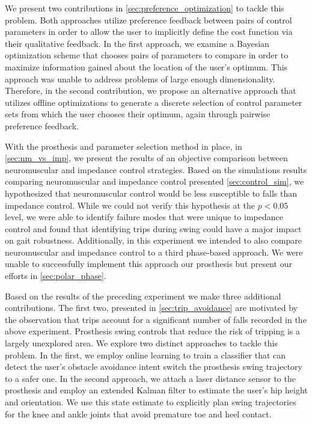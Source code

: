 We present two contributions in \cref{sec:preference_optimization} to tackle
this problem. Both approaches utilize preference feedback between pairs of
control parameters in order to allow the user to implicitly define the cost
function via their qualitative feedback. In the first approach, we examine a
Bayesian optimization scheme that chooses pairs of parameters to compare in
order to maximize information gained about the location of the user's optimum.
This approach was unable to address problems of large enough dimensionality.
Therefore, in the second contribution, we propose an alternative approach that
utilizes offline optimizations to generate a discrete selection of control
parameter sets from which the user chooses their optimum, again through pairwise
preference feedback.

With the prosthesis and parameter selection method in place, in
\cref{sec:nm_vs_imp}, we present the results of an objective comparison between
neuromuscular and impedance control strategies. Based on the simulations results
comparing neuromuscular and impedance control presented \cref{sec:control_sim},
we hypothesized that neuromuscular control would be less susceptible to falls
than impedance control. While we could not verify this hypothesis at the $p <
0.05$ level, we were able to identify failure modes that were unique to
impedance control and found that identifying trips during swing could have a
major impact on gait robustness. Additionally, in this experiment we intended to
also compare neuromuscular and impedance control to a third phase-based
approach. We were unable to successfully implement this approach our prosthesis
but present our efforts in \cref{sec:polar_phase}.

Based on the results of the preceding experiment we make three
additional contributions. The first two, presented in \cref{sec:trip_avoidance}
are motivated by the observation that trips account for a significant number of
falls recorded in the above experiment. Prosthesis swing controls that reduce
the risk of tripping is a largely unexplored area. We explore two distinct
approaches to tackle this problem. In the first, we employ online learning to
train a classifier that can detect the user's obstacle avoidance intent switch
the prosthesis swing trajectory to a safer one. In the second approach, we
attach a laser distance sensor to the prosthesis and employ an extended Kalman
filter to estimate the user's hip height and orientation. We use this state
estimate to explicitly plan swing trajectories for the knee and ankle joints
that avoid premature toe and heel contact.

